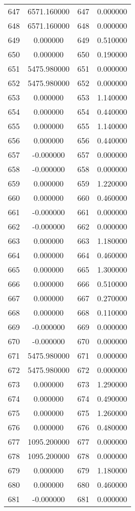 \documentclass[12pt]{article}
\begin{document}
\begin{longtable}{@{}cccc@{}}
647 & 6571.160000 & 647 & 0.000000 \\
648 & 6571.160000 & 648 & 0.000000 \\
649 & 0.000000 & 649 & 0.510000 \\
650 & 0.000000 & 650 & 0.190000 \\
651 & 5475.980000 & 651 & 0.000000 \\
652 & 5475.980000 & 652 & 0.000000 \\
653 & 0.000000 & 653 & 1.140000 \\
654 & 0.000000 & 654 & 0.440000 \\
655 & 0.000000 & 655 & 1.140000 \\
656 & 0.000000 & 656 & 0.440000 \\
657 & -0.000000 & 657 & 0.000000 \\
658 & -0.000000 & 658 & 0.000000 \\
659 & 0.000000 & 659 & 1.220000 \\
660 & 0.000000 & 660 & 0.460000 \\
661 & -0.000000 & 661 & 0.000000 \\
662 & -0.000000 & 662 & 0.000000 \\
663 & 0.000000 & 663 & 1.180000 \\
664 & 0.000000 & 664 & 0.460000 \\
665 & 0.000000 & 665 & 1.300000 \\
666 & 0.000000 & 666 & 0.510000 \\
667 & 0.000000 & 667 & 0.270000 \\
668 & 0.000000 & 668 & 0.110000 \\
669 & -0.000000 & 669 & 0.000000 \\
670 & -0.000000 & 670 & 0.000000 \\
671 & 5475.980000 & 671 & 0.000000 \\
672 & 5475.980000 & 672 & 0.000000 \\
673 & 0.000000 & 673 & 1.290000 \\
674 & 0.000000 & 674 & 0.490000 \\
675 & 0.000000 & 675 & 1.260000 \\
676 & 0.000000 & 676 & 0.480000 \\
677 & 1095.200000 & 677 & 0.000000 \\
678 & 1095.200000 & 678 & 0.000000 \\
679 & 0.000000 & 679 & 1.180000 \\
680 & 0.000000 & 680 & 0.460000 \\
681 & -0.000000 & 681 & 0.000000 \\

\end{longtable}
\end{document}
